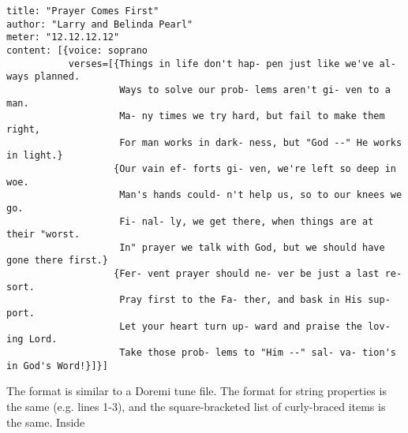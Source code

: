 \documentclass{article}
\begin{document}
\resetlinenumber
\linenumbers
\begin{verbatim}
title: "Prayer Comes First"
author: "Larry and Belinda Pearl"
meter: "12.12.12.12"
content: [{voice: soprano
           verses=[{Things in life don't hap- pen just like we've al- ways planned.
                    Ways to solve our prob- lems aren't gi- ven to a man.
                    Ma- ny times we try hard, but fail to make them right,
                    For man works in dark- ness, but "God --" He works in light.}
                   {Our vain ef- forts gi- ven, we're left so deep in woe.
                    Man's hands could- n't help us, so to our knees we go.
                    Fi- nal- ly, we get there, when things are at their "worst.
                    In" prayer we talk with God, but we should have gone there first.}
                   {Fer- vent prayer should ne- ver be just a last re- sort.
                    Pray first to the Fa- ther, and bask in His sup- port.
                    Let your heart turn up- ward and praise the lov- ing Lord.
                    Take those prob- lems to "Him --" sal- va- tion's in God's Word!}]}]
\end{verbatim}
\nolinenumbers

The format is similar to a Doremi tune file.  The format for string
properties is the same (e.g. lines 1-3), and the square-bracketed list
of curly-braced items is the same.  Inside 
\end{document}
